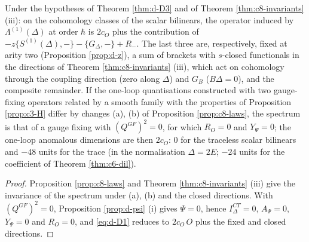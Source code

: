 \begin{theorem}
\label{thm:d-inv}
Under the hypotheses of Theorem \ref{thm:d-D3} and of Theorem \ref{thm:c8-invariants} (iii): on the cohomology classes of the scalar bilinears, the operator induced by $\Lambda^{(1)}(\Delta)$ at order $\hbar$ is $2c_O$ plus the contribution of $-z\{S^{(1)}(\Delta),-\}-\{G_\Delta,-\}+R_-$. The last three are, respectively, fixed at arity two (Proposition \ref{prop:d-z}), a sum of brackets with $s$-closed functionals in the directions of Theorem \ref{thm:c8-invariants} (iii), which act on cohomology through the coupling direction (zero along $\Delta$) and $G_B$ ($B\Delta=0$), and the composite remainder. If the one-loop quantisations constructed with two gauge-fixing operators related by a smooth family with the properties of Proposition \ref{prop:c3-H} differ by changes (a), (b) of Proposition \ref{prop:c8-laws}, the spectrum is that of a gauge fixing with $(Q^{GF})^2=0$, for which $R_O=0$ and $Y_\Psi=0$; the one-loop anomalous dimensions are then $2c_O$: $0$ for the traceless scalar bilinears and $-48$ units for the trace (in the normalisation $\Delta=2E$; $-24$ units for the coefficient of Theorem \ref{thm:c6-dil}).
\end{theorem}

\begin{proof}
Proposition \ref{prop:c8-laws} and Theorem \ref{thm:c8-invariants} (iii) give the invariance of the spectrum under (a), (b) and the closed directions. With $(Q^{GF})^2=0$, Proposition \ref{prop:d-psi} (i) gives $\Psi=0$, hence $I^{CT}_\Delta=0$, $A_\Psi=0$, $Y_\Psi=0$ and $R_O=0$, and \eqref{eq:d-D1} reduces to $2c_O\,O$ plus the fixed and closed directions.
\end{proof}


